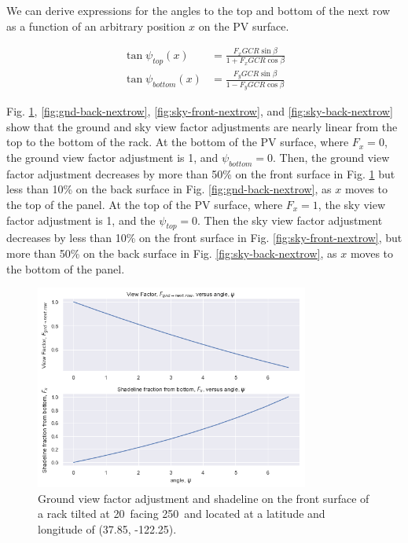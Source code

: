 \documentclass[conference]{IEEEtran}
\begin{document}
We can derive expressions for the angles to the top and bottom of the next row as a function of an arbitrary position $x$ on the PV surface.

\begin{align}
\tan \psi_{top}\left(x \right) &= \frac{F_x GCR \sin \beta}{1 + F_x GCR \cos \beta}\\
\tan \psi_{bottom}\left(x \right) &= \frac{F_y GCR \sin \beta}{1 - F_y GCR \cos \beta}
\end{align}

Fig. \ref{fig:gnd-front-nextrow}, \ref{fig:gnd-back-nextrow}, \ref{fig:sky-front-nextrow}, and \ref{fig:sky-back-nextrow} show that the ground and sky view factor adjustments are nearly linear from the top to the bottom of the rack.  At the bottom of the PV surface, where $F_x=0$, the ground view factor adjustment is 1, and $\psi_{bottom}=0$.  Then, the ground view factor adjustment decreases by more than 50\% on the front surface in Fig. \ref{fig:gnd-front-nextrow} but less than 10\% on the back surface in Fig. \ref{fig:gnd-back-nextrow}, as $x$ moves to the top of the panel.  At the top of the PV surface, where $F_x=1$, the sky view factor adjustment is 1, and the $\psi_{top}=0$.  Then the sky view factor adjustment decreases by less than 10\% on the front surface in Fig. \ref{fig:sky-front-nextrow}, but more than 50\% on the back surface in Fig. \ref{fig:sky-back-nextrow}, as $x$ moves to the bottom of the panel.

\begin{figure}
\centering
\includegraphics[width=9cm]{ground_diffuse_front_w-next_row.png}
\caption{Ground view factor adjustment and shadeline on the front surface of a rack tilted at 20\degree\ facing 250\degree\ and located at a latitude and longitude of (37.85\degree, -122.25\degree).}
\label{fig:gnd-front-nextrow}
\end{figure}
\end{document}
